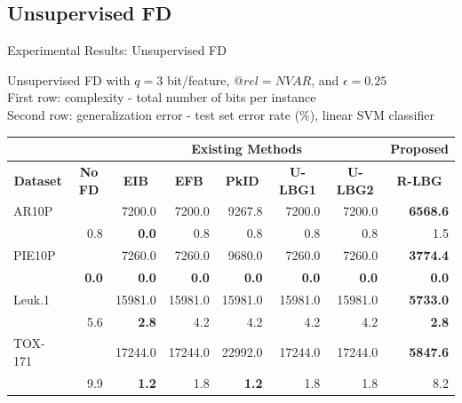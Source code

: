 \documentclass{beamer}
\begin{document}
\subsection[Unsupervised FD]{Unsupervised FD}
\begin{frame}{Experimental Results: Unsupervised FD}
\begin{table} [t]
\scriptsize{Unsupervised FD with $q=3$ bit/feature, $@rel=NVAR$,
and $\epsilon=0.25$ \\ 
First row: complexity - total number of bits per instance\\ 
Second row: generalization error - test set error rate (\%), linear SVM classifier} \\ \vspace{2mm}
\centering \scriptsize
\begin{tabular}{lr|r|r|r|r|r|r|} 
  \cline{3-8}
    & & \multicolumn{5}{|c|}{\textbf{Existing Methods}} & \multicolumn{1}{|c|}{\textbf{Proposed}} \\ \hline
   \multicolumn{1}{|c|}{\textbf{Dataset}} & \multicolumn{1}{|c|}{\textbf{No FD}} & \multicolumn{1}{|c|}{\textbf{EIB}} & \multicolumn{1}{|c|}{\textbf{EFB}} & \multicolumn{1}{|c|}{\textbf{PkID}} & \multicolumn{1}{|c|}{\textbf{U-LBG1}} & \multicolumn{1}{|c|}{\textbf{U-LBG2}} & \multicolumn{1}{|c|}{\textbf{R-LBG}}  \\ \hline
 	 \multicolumn{1}{|l|}{AR10P}  &  & 7200.0 & 7200.0 & 9267.8 & 7200.0 & 7200.0 & \textbf{6568.6}  \\ \cline{2-8}
   \multicolumn{1}{|l|}{ }    & 0.8 & \textbf{0.0} & 0.8 & 0.8 & 0.8 & 0.8 & 1.5 \\ \hline

   \multicolumn{1}{|l|}{PIE10P}  &  & 7260.0 & 7260.0 & 9680.0 & 7260.0 & 7260.0 & \textbf{3774.4}  \\ \cline{2-8}
   \multicolumn{1}{|l|}{ }    & \textbf{0.0} & \textbf{0.0} & \textbf{0.0} & \textbf{0.0} & \textbf{0.0} & \textbf{0.0} & \textbf{0.0} \\ \hline

   \multicolumn{1}{|l|}{Leuk.1}  &  & 15981.0 & 15981.0 & 15981.0 & 15981.0 & 15981.0 & \textbf{5733.0} \\ \cline{2-8}
   \multicolumn{1}{|l|}{ }    &  5.6   & \textbf{2.8} & 4.2 & 4.2 & 4.2 & 4.2 & \textbf{2.8} \\ \hline

   \multicolumn{1}{|l|}{TOX-171}  &  & 17244.0 & 17244.0 & 22992.0 & 17244.0 & 17244.0 & \textbf{5847.6} \\ \cline{2-8}
   \multicolumn{1}{|l|}{ }    & 9.9  & \textbf{1.2}     &  1.8    &  \textbf{1.2}    & 1.8 & 1.8 & 8.2  \\ \hline


\end{tabular}
\end{table}
\end{frame}
\end{document}

